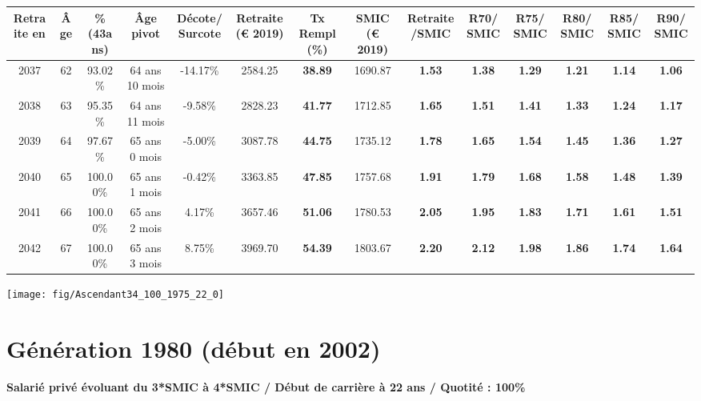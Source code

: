 \begin{adjustbox}{max width=\textwidth} 
\begin{tabular}[htb]{|c|c||c|c|c||c|c||c|c||c|c|c|c|c|} 
\hline 
 Retraite en &  Âge &  \%(43ans) &  Âge pivot &  Décote/Surcote &  Retraite (\euro{} 2019) &  Tx Rempl(\%) &  SMIC (\euro{} 2019) &  Retraite/SMIC &  R70/SMIC &  R75/SMIC &  R80/SMIC &  R85/SMIC &  R90/SMIC \\ 
\hline \hline 
 2037 &  62 &  93.02\% &  64 ans 10 mois &  -14.17\% &  2584.25 &  {\bf 38.89} &  1690.87 &  {\bf 1.53} &  {\bf 1.38} &  {\bf 1.29} &  {\bf 1.21} &  {\bf 1.14} &  {\bf 1.06} \\ 
\hline 
 2038 &  63 &  95.35\% &  64 ans 11 mois &  -9.58\% &  2828.23 &  {\bf 41.77} &  1712.85 &  {\bf 1.65} &  {\bf 1.51} &  {\bf 1.41} &  {\bf 1.33} &  {\bf 1.24} &  {\bf 1.17} \\ 
\hline 
 2039 &  64 &  97.67\% &  65 ans 0 mois &  -5.00\% &  3087.78 &  {\bf 44.75} &  1735.12 &  {\bf 1.78} &  {\bf 1.65} &  {\bf 1.54} &  {\bf 1.45} &  {\bf 1.36} &  {\bf 1.27} \\ 
\hline 
 2040 &  65 &  100.00\% &  65 ans 1 mois &  -0.42\% &  3363.85 &  {\bf 47.85} &  1757.68 &  {\bf 1.91} &  {\bf 1.79} &  {\bf 1.68} &  {\bf 1.58} &  {\bf 1.48} &  {\bf 1.39} \\ 
\hline 
 2041 &  66 &  100.00\% &  65 ans 2 mois &  4.17\% &  3657.46 &  {\bf 51.06} &  1780.53 &  {\bf 2.05} &  {\bf 1.95} &  {\bf 1.83} &  {\bf 1.71} &  {\bf 1.61} &  {\bf 1.51} \\ 
\hline 
 2042 &  67 &  100.00\% &  65 ans 3 mois &  8.75\% &  3969.70 &  {\bf 54.39} &  1803.67 &  {\bf 2.20} &  {\bf 2.12} &  {\bf 1.98} &  {\bf 1.86} &  {\bf 1.74} &  {\bf 1.64} \\ 
\hline 
\hline 
\end{tabular} 
\end{adjustbox} 
 
 \vspace{0.1cm} 

 {\hspace{-2.2cm}\texttt{[image: fig/Ascendant34\_100\_1975\_22\_0]}} 

\newpage 
 
\section{Génération 1980 (début en 2002)\label{Ascendant34_100_1980_22_0}} 
 
{\bf \noindent Salarié privé évoluant du 3*SMIC à 4*SMIC / Début de carrière à 22 ans / Quotité : 100\%}  ~ 

